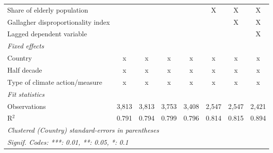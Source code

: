 \begin{tabular}{lccccccc}
   Share of elderly population                                       &               &               &               &               & X             & X             & X\\  
   Gallagher disproportionality index                                &               &               &               &               &               & X             & X\\  
   Lagged dependent variable                                         &               &               &               &               &               &               & X\\  
   \emph{Fixed effects}\\
   Country                                                           & x             & x             & x             & x             & x             & x             & x\\  
   Half decade                                                       & x             & x             & x             & x             & x             & x             & x\\  
   Type of climate action/measure                                    & x             & x             & x             & x             & x             & x             & x\\  
   \midrule \emph{Fit statistics}\\
   Observations                                                      & 3,813         & 3,813         & 3,753         & 3,408         & 2,547         & 2,547         & 2,421\\  
   R$^2$                                                             & 0.791         & 0.794         & 0.799         & 0.796         & 0.814         & 0.815         & 0.894\\  
   \midrule
   \multicolumn{8}{l}{\emph{Clustered (Country) standard-errors in parentheses}}\\
   \multicolumn{8}{l}{\emph{Signif. Codes: ***: 0.01, **: 0.05, *: 0.1}}\\
\end{tabular}
\par\endgroup



